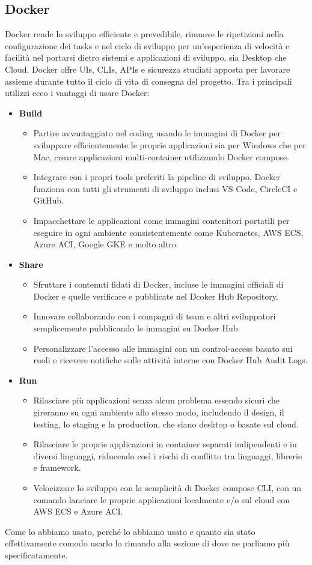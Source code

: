 \documentclass{article}
\begin{document}
\subsection{Docker}
Docker rende lo sviluppo efficiente e prevedibile, rimuove le ripetizioni nella configurazione dei tasks e nel ciclo di sviluppo per un'esperienza di velocità e facilità nel portarsi dietro sistemi e applicazioni di sviluppo, sia Desktop che Cloud. Docker offre UIs, CLIs, APIs e sicurezza studiati apposta per lavorare assieme durante tutto il ciclo di vita di consegna del progetto. Tra i principali utilizzi ecco i vantaggi di usare Docker:
\begin{itemize}
	\item \textbf{Build}
	\begin{itemize}
		\item Partire avvantaggiato nel coding usando le immagini di Docker per sviluppare efficientemente le proprie applicazioni sia per Windows che per Mac, creare applicazioni multi-container utilizzando Docker compose.
		\item Integrare con i propri tools preferiti la pipeline di sviluppo, Docker funziona con tutti gli strumenti di sviluppo inclusi VS Code, CircleCI e GitHub.
		\item Impacchettare le applicazioni come immagini contenitori portatili per eseguire in ogni ambiente consistentemente come Kubernetes, AWS ECS, Azure ACI, Google GKE e molto altro.
	\end{itemize}
	\item \textbf{Share}
	\begin{itemize}
		\item Sfruttare i contenuti fidati di Docker, incluse le immagini officiali di Docker e quelle verificare e pubblicate nel Dcoker Hub Repository.
		\item Innovare collaborando con i compagni di team e altri sviluppatori semplicemente pubblicando le immagini su Docker Hub.
		\item Personalizzare l'accesso alle immagini con un control-access basato sui ruoli e ricevere notifiche sulle attività interne con Docker Hub Audit Logs.
	\end{itemize}
	\item \textbf{Run}
	\begin{itemize}
		\item Rilasciare più applicazioni senza alcun problema essendo sicuri che gireranno su ogni ambiente allo stesso modo, includendo il design, il testing, lo staging e la production, che siano desktop o basate sul cloud.
		\item Rilasciare le proprie applicazioni in container separati indipendenti e in diversi linguaggi, riducendo così i rischi di conflitto tra linguaggi, librerie e framework.
		\item Velocizzare lo sviluppo con la semplicità di Docker compose CLI, con un comando lanciare le proprie applicazioni localmente e/o sul cloud con AWS ECS e Azure ACI.
	\end{itemize}
\end{itemize}
Come lo abbiamo usato, perché lo abbiamo usato e quanto sia stato effettivamente comodo usarlo lo rimando alla sezione di  dove ne parliamo più specificatamente.
\end{document}
